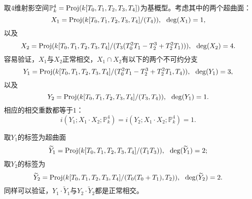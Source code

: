 \begin{example}
\label{complicated eg of intersection trees}
取$4$维射影空间$\mathbb{P}_k^4 = \operatorname{Proj}(k[T_0,T_1,T_2,T_3,T_4])$为基概型。考虑其中的两个超曲面：
\begin{equation}
X_1 = \operatorname{Proj}(k[T_0,T_1,T_2,T_3,T_4] / (T_4)), ~~ \deg(X_1) = 1,
\end{equation}
以及
\begin{equation}
X_2 = \operatorname{Proj}(k[T_0,T_1,T_2,T_3,T_4] / (T_3(T_0^2T_1-T_2^3+T_2^2T_1))), ~~ \deg(X_2) = 4.
\end{equation}
容易验证，$X_1$与$X_2$正常相交，$X_1\cap X_2$有以下的两个不可约分支
\begin{equation}
Y_1 = \operatorname{Proj}(k[T_0,T_1,T_2,T_3,T_4] / (T_0^2T_1-T_2^3+T_2^2T_1, T_4)), ~~ \deg(Y_1) = 3,
\end{equation}
以及
\begin{equation}
Y_2 = \operatorname{Proj}(k[T_0,T_1,T_2,T_3,T_4] / (T_3, T_4)), ~~ \deg(Y_1) = 1.
\end{equation}
相应的相交重数都等于$1$：
\begin{equation}
i(Y_1; X_1\cdot X_2; \mathbb{P}_k^4) = i(Y_2; X_1\cdot X_2; \mathbb{P}_k^4) = 1.
\end{equation}

取$Y_1$的标签为超曲面
\begin{equation}
\widetilde{Y}_1 = \operatorname{Proj}(k[T_0,T_1,T_2,T_3,T_4] / (T_1T_3)), ~~ \deg(\widetilde{Y}_1) = 2;
\end{equation}
取$Y_2$的标签为
\begin{equation}
\widetilde{Y}_2 = \operatorname{Proj}(k[T_0,T_1,T_2,T_3,T_4] / (T_0(T_0+T_1), T_2)), ~~ \deg(\widetilde{Y}_2) = 2.
\end{equation}
同样可以验证，$Y_1\cdot\widetilde{Y}_1$与$Y_2\cdot\widetilde{Y}_2$都是正常相交。


\end{example}
